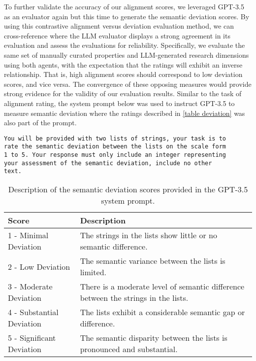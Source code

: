 To further validate the accuracy of our alignment scores, we leveraged GPT-3.5 as an evaluator again but this time to generate the semantic deviation scores. By using this contrastive alignment versus deviation evaluation method, we can cross-reference where the LLM evaluator displays a strong agreement in its evaluation and assess the evaluations for reliability. Specifically, we evaluate the same set of manually curated properties and LLM-generated research dimensions using both agents, with the expectation that the ratings will exhibit an inverse relationship. That is, high alignment scores should correspond to low deviation scores, and vice versa. The convergence of these opposing measures would provide strong evidence for the validity of our evaluation results. Similar to the task of alignment rating, the system prompt below was used to instruct GPT-3.5 to measure semantic deviation where the ratings described in \autoref{table deviation} was also part of the prompt.

\begin{verbatim}
You will be provided with two lists of strings, your task is to
rate the semantic deviation between the lists on the scale form
1 to 5. Your response must only include an integer representing
your assessment of the semantic deviation, include no other 
text.
\end{verbatim}

\begin{table}[!htb] 
\caption{Description of the semantic deviation scores provided in the GPT-3.5 system prompt.\label{table deviation}}
\begin{tabular}{|l|p{8cm}|}
\hline
\textbf{Score}	& \textbf{Description}\\
\hline
1 - Minimal Deviation &
The strings in the lists show little or no semantic difference. \\
2 - Low Deviation &
The semantic variance between the lists is limited. \\
3 - Moderate Deviation &
There is a moderate level of semantic difference between the strings in the lists. \\
4 - Substantial Deviation &
The lists exhibit a considerable semantic gap or difference. \\
5 - Significant Deviation &
The semantic disparity between the lists is pronounced and substantial. \\
\hline
\end{tabular}
\end{table}

